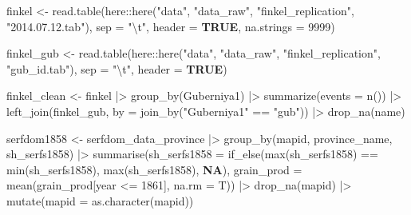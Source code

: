 \documentclass[
  9pt,
  letterpaper,
  DIV=11,
  numbers=noendperiod]{scrartcl}
\newenvironment{Shaded}{\begin{snugshade}}{\end{snugshade}}
\newcommand{\AttributeTok}[1]{\textcolor[rgb]{0.16,0.50,0.73}{#1}}
\newcommand{\ConstantTok}[1]{\textcolor[rgb]{0.15,0.68,0.68}{\textbf{#1}}}
\newcommand{\DecValTok}[1]{\textcolor[rgb]{0.96,0.45,0.00}{#1}}
\newcommand{\FunctionTok}[1]{\textcolor[rgb]{0.56,0.27,0.68}{#1}}
\newcommand{\NormalTok}[1]{\textcolor[rgb]{0.81,0.81,0.76}{#1}}
\newcommand{\OtherTok}[1]{\textcolor[rgb]{0.15,0.68,0.38}{#1}}
\newcommand{\SpecialCharTok}[1]{\textcolor[rgb]{0.24,0.68,0.91}{#1}}
\newcommand{\StringTok}[1]{\textcolor[rgb]{0.96,0.31,0.31}{#1}}
\begin{document}
\begin{Shaded}
\begin{Highlighting}[]
\NormalTok{finkel }\OtherTok{\textless{}{-}} \FunctionTok{read.table}\NormalTok{(here}\SpecialCharTok{::}\FunctionTok{here}\NormalTok{(}\StringTok{"data"}\NormalTok{, }\StringTok{"data\_raw"}\NormalTok{, }\StringTok{"finkel\_replication"}\NormalTok{, }
                                \StringTok{"2014.07.12.tab"}\NormalTok{), }
                     \AttributeTok{sep =} \StringTok{"}\SpecialCharTok{\textbackslash{}t}\StringTok{"}\NormalTok{, }\AttributeTok{header =} \ConstantTok{TRUE}\NormalTok{, }\AttributeTok{na.strings =} \DecValTok{9999}\NormalTok{)}

\NormalTok{finkel\_gub }\OtherTok{\textless{}{-}} \FunctionTok{read.table}\NormalTok{(here}\SpecialCharTok{::}\FunctionTok{here}\NormalTok{(}\StringTok{"data"}\NormalTok{, }\StringTok{"data\_raw"}\NormalTok{, }\StringTok{"finkel\_replication"}\NormalTok{, }
                                    \StringTok{"gub\_id.tab"}\NormalTok{), }
                          \AttributeTok{sep =} \StringTok{"}\SpecialCharTok{\textbackslash{}t}\StringTok{"}\NormalTok{, }\AttributeTok{header =} \ConstantTok{TRUE}\NormalTok{)}

\NormalTok{finkel\_clean }\OtherTok{\textless{}{-}}\NormalTok{ finkel }\SpecialCharTok{|\textgreater{}} 
  \FunctionTok{group\_by}\NormalTok{(Guberniya1) }\SpecialCharTok{|\textgreater{}}
  \FunctionTok{summarize}\NormalTok{(}\AttributeTok{events =} \FunctionTok{n}\NormalTok{()) }\SpecialCharTok{|\textgreater{}} 
  \FunctionTok{left\_join}\NormalTok{(finkel\_gub, }\AttributeTok{by =} \FunctionTok{join\_by}\NormalTok{(}\StringTok{"Guberniya1"} \SpecialCharTok{==} \StringTok{"gub"}\NormalTok{)) }\SpecialCharTok{|\textgreater{}} 
  \FunctionTok{drop\_na}\NormalTok{(name)}
\end{Highlighting}
\end{Shaded}

\begin{Shaded}
\begin{Highlighting}[]
\NormalTok{serfdom1858 }\OtherTok{\textless{}{-}}\NormalTok{ serfdom\_data\_province }\SpecialCharTok{|\textgreater{}} 
  \FunctionTok{group\_by}\NormalTok{(mapid, province\_name, sh\_serfs1858) }\SpecialCharTok{|\textgreater{}} 
  \FunctionTok{summarise}\NormalTok{(}\AttributeTok{sh\_serfs1858 =} \FunctionTok{if\_else}\NormalTok{(}\FunctionTok{max}\NormalTok{(sh\_serfs1858) }\SpecialCharTok{==} \FunctionTok{min}\NormalTok{(sh\_serfs1858), }
                                   \FunctionTok{max}\NormalTok{(sh\_serfs1858), }\ConstantTok{NA}\NormalTok{),}
            \AttributeTok{grain\_prod =} \FunctionTok{mean}\NormalTok{(grain\_prod[year }\SpecialCharTok{\textless{}=} \DecValTok{1861}\NormalTok{], }\AttributeTok{na.rm =}\NormalTok{ T)) }\SpecialCharTok{|\textgreater{}} 
  \FunctionTok{drop\_na}\NormalTok{(mapid) }\SpecialCharTok{|\textgreater{}} 
  \FunctionTok{mutate}\NormalTok{(}\AttributeTok{mapid =} \FunctionTok{as.character}\NormalTok{(mapid))}
\end{Highlighting}
\end{Shaded}
\end{document}
